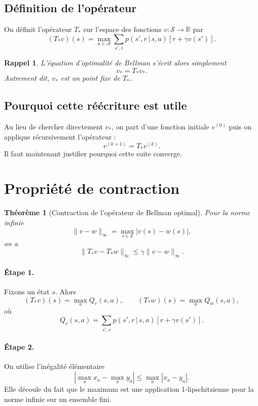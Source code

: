 \documentclass[11pt,a4paper]{article}
\newtheorem*{rappel}{Rappel}
\newtheorem*{theoreme}{Théorème}
\newcommand{\R}{\mathbb{R}}
\newcommand{\given}{\,|\,}
\begin{document}
\subsection{Définition de l'opérateur}

On définit l'opérateur $T_*$ sur l'espace des fonctions $v:\mathcal S \to \R$ par
\[
(T_*v)(s)=\max_{a\in\mathcal A}\sum_{s',r} p(s',r\given s,a)\left[r+\gamma v(s')\right].
\]

\begin{rappel}
L'équation d'optimalité de Bellman s'écrit alors simplement
\[
v_* = T_* v_*.
\]
Autrement dit, $v_*$ est un point fixe de $T_*$.
\end{rappel}

\subsection{Pourquoi cette réécriture est utile}

Au lieu de chercher directement $v_*$, on part d'une fonction initiale $v^{(0)}$ puis on applique récursivement l'opérateur :
\[
v^{(k+1)} = T_* v^{(k)}.
\]
Il faut maintenant justifier pourquoi cette suite converge.

\section{Propriété de contraction}

\begin{theoreme}[Contraction de l'opérateur de Bellman optimal]
Pour la norme infinie
\[
\|v-w\|_{\infty} = \max_{s\in\mathcal S}|v(s)-w(s)|,
\]
on a
\[
\|T_*v - T_*w\|_{\infty} \le \gamma \|v-w\|_{\infty}.
\]
\end{theoreme}

\paragraph{Étape 1.}
Fixons un état $s$. Alors
\[
(T_*v)(s)=\max_a Q_v(s,a), \qquad (T_*w)(s)=\max_a Q_w(s,a),
\]
où
\[
Q_v(s,a)=\sum_{s',r} p(s',r\given s,a)\left[r+\gamma v(s')\right].
\]

\paragraph{Étape 2.}
On utilise l'inégalité élémentaire
\[
|\max_a x_a - \max_a y_a| \le \max_a |x_a-y_a|.
\]
Elle découle du fait que le maximum est une application 1-lipschitzienne pour la norme infinie sur un ensemble fini.
\end{document}
